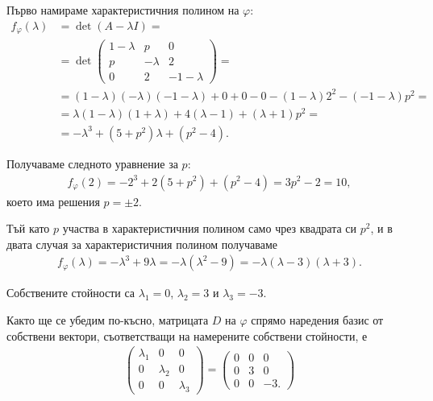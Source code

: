 \documentclass[numbers=endperiod, bibliography=totocnumbered]{scrartcl}
\begin{document}
\begin{solution}
  Първо намираме характеристичния полином на \( \varphi \):
  \begin{align*}
    f_\varphi(\lambda)
    &=
    \det(A - \lambda I)
    = \\ &=
    \det \begin{pmatrix}
      1 - \lambda & p & 0 \\
      p & -\lambda & 2 \\
      0 & 2 & -1-\lambda
    \end{pmatrix}
    = \\ &=
    (1-\lambda) (-\lambda) (-1-\lambda) + 0 + 0 - 0 - (1-\lambda) 2^2 - (-1-\lambda) p^2
    = \\ &=
    \lambda (1 - \lambda) (1 + \lambda) + 4 (\lambda - 1) + (\lambda + 1) p^2
    = \\ &=
    -\lambda^3 + (5 + p^2) \lambda + (p^2 - 4).
  \end{align*}

  Получаваме следното уравнение за \( p \):
  \begin{align*}
    f_\varphi(2) = -2^3 + 2 (5+p^2) + (p^2-4) = 3 p^2 - 2 = 10,
  \end{align*}
  което има решения \( p = \pm 2 \).

  Тъй като \( p \) участва в характеристичния полином само чрез квадрата си \( p^2 \), и в двата случая за характеристичния полином получаваме
  \begin{align*}
    f_\varphi(\lambda) = -\lambda^3 + 9 \lambda = -\lambda(\lambda^2 - 9) = \boxed{-\lambda (\lambda - 3) (\lambda + 3)}.
  \end{align*}

  Собствените стойности са \( \lambda_1 = 0 \), \( \lambda_2 = 3 \) и \( \lambda_3 = -3 \).

  Както ще се убедим по-късно, матрицата \( D \) на \( \varphi \) спрямо наредения базис от собствени вектори, съответстващи на намерените собствени стойности, е
  \begin{align*}
    \begin{pmatrix}
      \lambda_1 & 0 & 0 \\
      0 & \lambda_2 & 0 \\
      0 & 0 & \lambda_3
    \end{pmatrix}
    =
    \begin{pmatrix}
      0 & 0 & 0 \\
      0 & 3 & 0 \\
      0 & 0 & -3.
    \end{pmatrix}
  \end{align*}


\end{solution}
\end{document}
